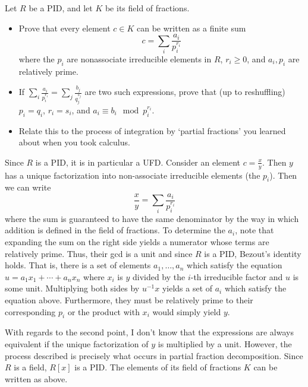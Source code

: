 \documentclass[../../master.tex]{subfiles}
\begin{document}
    \begin{problem}
        Let $R$ be a PID, and let $K$ be its field of fractions.
        \begin{itemize}
            \item Prove that every element $c \in K$ can be written as a finite
                sum
                \[
                    c = \sum_i \frac{a_i}{p_i^{r_i}}
                \] 
                where the $p_i$ are nonassociate irreducible elements in $R$,
                $r_i \geq 0$, and $a_i, p_i$ are relatively prime.

            \item If $\sum_i \frac{a_i}{p_i^{r_i}} = \sum_j
                \frac{b_j}{q_j^{s_j}}$ are two such expressions, prove that (up
                to reshuffling) $p_i = q_i$, $r_i = s_i$, and $a_i \equiv b_i
                \mod p_i^{r_i}$.
            \item Relate this to the process of integration by `partial
                fractions' you learned about when you took calculus.
        \end{itemize}
    \end{problem}

    \begin{solution}
        Since $R$ is a PID, it is in particular a UFD. Consider an element $c =
        \frac{x}{y}$. Then $y$ has a unique factorization into non-associate
        irreducible elements (the $p_i$). Then we can write
        \[
            \frac{x}{y} = \sum_i \frac{a_i}{p_i^{r_i}}
        \] 
        where the sum is guaranteed to have the same denominator by the way in
        which addition is defined in the field of fractions. To determine the
        $a_i$, note that expanding the sum on the right side yields a numerator
        whose terms are relatively prime. Thus, their gcd is a unit and since
        $R$ is a PID, Bezout's identity holds. That is, there is a set of elements
        $a_1, \ldots, a_n$ which satisfy the equation $u = a_1 x_1 + \cdots + a_n
        x_n$ where $x_i$ is $y$ divided by the $i$-th irreducible factor and
        $u$ is some unit. Multiplying both sides by $u^{-1}x$ yields a set of
        $a_i$ which satisfy the equation above. Furthermore, they must be
        relatively prime to their corresponding $p_i$ or the product with
        $x_i$ would simply yield $y$.
        
        With regards to the second point, I don't know that the expressions are
        always equivalent if the unique factorization of $y$ is multiplied by a
        unit. However, the process described is precisely what occurs in partial
        fraction decomposition. Since $R$ is a field, $R[x]$ is a PID. The
        elements of its field of fractions $K$ can be written as above.
    \end{solution}
\end{document}

